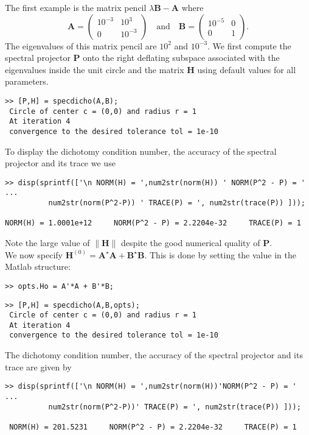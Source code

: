 \documentclass[acmtocl]{acmtrans2m}
\newcommand{\Am}{\mathbf{A}}
\newcommand{\Bm}{\mathbf{B}}
\newcommand{\Hm}{\mathbf{H}}
\newcommand{\Pm}{\mathbf{P}}
\begin{document}
 The first example is  the matrix pencil $\lambda \Bm - \Am$  where
\begin{equation}
\Am =  \begin{pmatrix}
10^{-3}& 10^{3} \\
0 & 10^{-3}
\end{pmatrix}
\quad\text{and}\quad
\Bm =  \begin{pmatrix}
10^{-5} & 0 \\
0 &1
\end{pmatrix}.
\end{equation}
The eigenvalues of this matrix pencil are $10^2$ and $10^{-3}$. We first compute the spectral projector $\Pm$ onto the right deflating subspace associated with the eigenvalues inside the unit circle and the matrix $\Hm$  using default values for all parameters.
\begin{verbatim}
>> [P,H] = specdicho(A,B);
 Circle of center c = (0,0) and radius r = 1
 At iteration 4
 convergence to the desired tolerance tol = 1e-10
\end{verbatim}
To display the  dichotomy condition number, the accuracy of the spectral projector and its trace we use
\begin{verbatim}
>> disp(sprintf(['\n NORM(H) = ',num2str(norm(H)) ' NORM(P^2 - P) = ' ...
	      num2str(norm(P^2-P)) ' TRACE(P) = ', num2str(trace(P)) ]));

NORM(H) = 1.0001e+12     NORM(P^2 - P) = 2.2204e-32     TRACE(P) = 1
\end{verbatim}
Note the large value of $\|\Hm\|$ despite the good numerical quality of $\Pm$. \\
We now specify $\Hm^{(0)} = \Am^\star \Am + \Bm^\star \Bm$.
This is done by setting the value in the {\sc Matlab} structure:
\begin{verbatim}
>> opts.Ho = A'*A + B'*B;
\end{verbatim}
\begin{verbatim}
>> [P,H] = specdicho(A,B,opts);
 Circle of center c = (0,0) and radius r = 1
 At iteration 4
 convergence to the desired tolerance tol = 1e-10
\end{verbatim}
The dichotomy condition number, the accuracy of the spectral projector and its trace are given by
\begin{verbatim}
>> disp(sprintf(['\n NORM(H) = ',num2str(norm(H))'NORM(P^2 - P) = ' ...
	      num2str(norm(P^2-P))' TRACE(P) = ', num2str(trace(P)) ]));

 NORM(H) = 201.5231     NORM(P^2 - P) = 2.2204e-32     TRACE(P) = 1
\end{verbatim}
\end{document}
